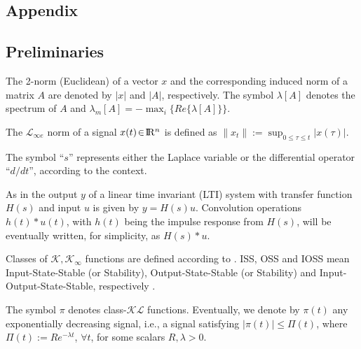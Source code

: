 \documentclass[letterpaper, 10 pt, conference]{ieeeconf}  %
\def\re{{\rm I}\! {\rm R}}
\theoremstyle{plain}
\theoremstyle{definition}
\theoremstyle{remark}
\begin{document}

\begin{footnotesize}
	\appendix
		\section{Appendix}
			\subsection{Preliminaries}
			The 2-norm (Euclidean) of a vector $x$ and the corresponding
			induced norm of a matrix $A$ are denoted by $|x|$ and $|A|$,
			respectively. The symbol $\lambda[A]$ denotes the spectrum of $A$
			and $\lambda_m[A]=-\max_i\{Re\{\lambda[A]\}\}$.
			
			
			The ${\mathcal{L}}_{\infty e}$ norm of a signal
			$x(t)\!\in\!\re^n$ is defined as
			$\|x_{t}\|\!:=\!\sup_{0\!\leq\!\tau\!\leq\!t} |x(\tau)|$.
			
			
			The symbol  ``$s$'' represents either the
			Laplace variable or the differential operator ``$d/dt$'', according
			to the context. 
			
			As in \cite{IS:96} the output $y$ of a linear time invariant (LTI) system with transfer function
			$H(s)$ and input $u$ is given by $y=H(s)u$. Convolution operations $h(t)*u(t)$, with $h(t)$ being the impulse response from $H(s)$, will be eventually written, for simplicity, as $H(s)*u$.
			
			
			Classes of $\mathcal{K}, \mathcal{K}_\infty$ functions are
			defined according to \cite[p.~144]{K:02}. ISS, OSS and IOSS mean
			Input-State-Stable (or Stability), Output-State-Stable (or
			Stability) and Input-Output-State-Stable, respectively
			\cite{SW:95}.
			
			
			The symbol $\pi$ denotes class-$\mathcal{KL}$ functions. Eventually, we denote by $\pi (t)$ any exponentially decreasing signal, i.e., a signal satisfying $|\pi(t)| \leq \Pi(t)$, where $\Pi(t):=R e^{-\lambda t}$, $\forall t$, for  some scalars $R,\lambda>0$.


\end{footnotesize}
\end{document}
